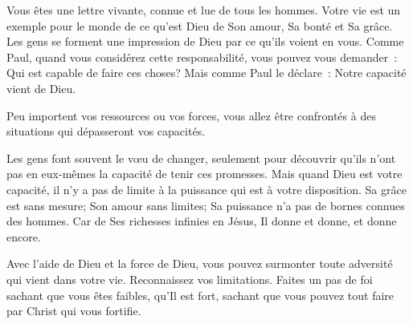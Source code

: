 



 
 \og Vous êtes une lettre vivante, connue et lue de tous les hommes. \fg{}
 Votre vie est un exemple pour le monde de ce qu'est Dieu \ocadr de Son amour,
 Sa bonté et Sa grâce.
 Les gens se forment une impression de Dieu par ce qu'ils voient en vous.
 Comme Paul, quand vous considérez cette responsabilité, 
 vous pouvez vous demander~: 
 \og Qui est capable de faire ces choses? \fg{}
 Mais  comme Paul le déclare~: 
 \og Notre capacité vient de Dieu. \fg{}

Peu importent vos ressources ou vos forces,
 vous allez être confrontés à des situations qui dépasseront vos capacités.


Les gens font souvent le vœu de changer, seulement pour découvrir
 qu'ils n'ont pas en eux-mêmes la capacité de tenir ces promesses.
 Mais quand Dieu est votre capacité, il n'y a pas de limite à la puissance
 qui est à votre disposition.
 Sa grâce est sans mesure; Son amour sans limites;
 Sa puissance n'a pas de bornes connues des hommes.
 Car de Ses richesses infinies en Jésus, Il donne et donne, et donne encore.

Avec l'aide de Dieu et la force de Dieu, vous pouvez surmonter
 toute adversité qui vient dans votre vie. Reconnaissez vos limitations.
 Faites un pas de foi sachant que vous êtes faibles, qu'Il est fort,
 sachant que vous pouvez tout faire par Christ qui vous fortifie.

\dvrule





